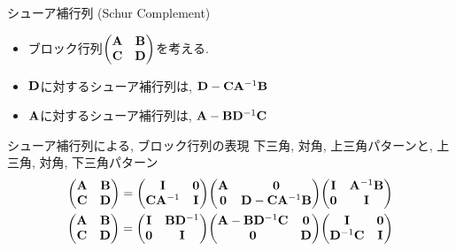 \documentclass[dvipdfmx,notheorems,t]{beamer}
\begin{document}
\begin{frame}{シューア補行列 (Schur Complement)}
\begin{itemize}
  \item ブロック行列$\mqty(\vb{A} & \vb{B} \\ \vb{C} & \vb{D})$を考える.
  \item $\vb{D}$に対するシューア補行列は, $\vb{D} - \vb{C} \vb{A}^{-1} \vb{B}$
  \item $\vb{A}$に対するシューア補行列は, $\vb{A} - \vb{B} \vb{D}^{-1} \vb{C}$
\end{itemize}

\begin{block}{シューア補行列による, ブロック行列の表現}
  下三角, 対角, 上三角パターンと, 上三角, 対角, 下三角パターン
  \begin{gather*}
    \mqty(\vb{A} & \vb{B} \\ \vb{C} & \vb{D})
      = \mqty(\vb{I} & \vb{0} \\ \vb{C} \vb{A}^{-1} & \vb{I})
        \mqty(\dmat[\vb{0}]{\vb{A}, \vb{D} - \vb{C} \vb{A}^{-1} \vb{B}})
        \mqty(\vb{I} & \vb{A}^{-1} \vb{B} \\ \vb{0} & \vb{I}) \\
    \mqty(\vb{A} & \vb{B} \\ \vb{C} & \vb{D})
      = \mqty(\vb{I} & \vb{B} \vb{D}^{-1} \\ \vb{0} & \vb{I})
        \mqty(\dmat[\vb{0}]{\vb{A} - \vb{B} \vb{D}^{-1} \vb{C}, \vb{D}})
        \mqty(\vb{I} & \vb{0} \\ \vb{D}^{-1} \vb{C} & \vb{I})
  \end{gather*}
\end{block}
\end{frame}
\end{document}
